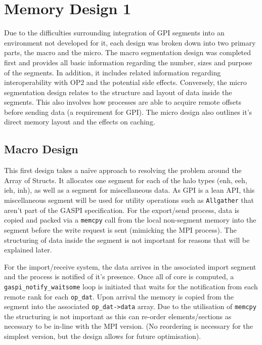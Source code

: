 \section{Memory Design 1}

Due to the difficulties surrounding integration of GPI segments into an environment not developed for it, each design was broken down into two primary parts, the macro and the micro. The macro segmentation design was completed first and provides all basic information regarding the number, sizes and purpose of the segments. In addition, it includes related information regarding interoperability with OP2 and the potential side effects. Conversely, the micro segmentation design relates to the structure and layout of data inside the segments. This also involves how processes are able to acquire remote offsets before sending data (a requirement for GPI). The micro design also outlines it's direct memory layout and the effects on caching. 


\subsection{Macro Design}
This first design takes a naïve approach to resolving the problem around the Array of Structs. It allocates one segment for each of the halo types (enh, eeh, ieh, inh), as well as a segment for miscellaneous data. As GPI is a lean API, this miscellaneous segment will be used for utility operations such as \texttt{Allgather} that aren't part of the GASPI specification. For the export/send process, data is copied and packed via a \texttt{memcpy} call from the local non-segment memory into the segment before the write request is sent (mimicking the MPI process). The structuring of data inside the segment is not important for reasons that will be explained later.

For the import/receive system, the data arrives in the associated import segment and the process is notified of it's presence. Once all of core is computed, a \texttt{gaspi\_notify\_waitsome} loop is initiated that waits for the notification from each remote rank for each \texttt{op\_dat}. Upon arrival the memory is copied from the segment into the associated \texttt{op\_dat->data} array.  Due to the utilisation of \texttt{memcpy} the structuring is not important as this can re-order elements/sections as necessary to be in-line with the MPI version. (No reordering is necessary for the simplest version, but the design allows for future optimisation).

